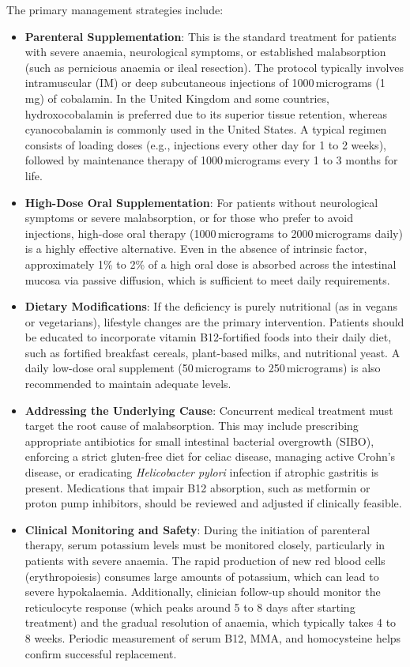 The primary management strategies include:
\begin{itemize}
    \item \textbf{Parenteral Supplementation}: This is the standard treatment for patients with severe anaemia, neurological symptoms, or established malabsorption (such as pernicious anaemia or ileal resection). The protocol typically involves intramuscular (IM) or deep subcutaneous injections of 1000\,micrograms (1\,mg) of cobalamin. In the United Kingdom and some countries, hydroxocobalamin is preferred due to its superior tissue retention, whereas cyanocobalamin is commonly used in the United States. A typical regimen consists of loading doses (e.g., injections every other day for 1 to 2 weeks), followed by maintenance therapy of 1000\,micrograms every 1 to 3 months for life.
    \item \textbf{High-Dose Oral Supplementation}: For patients without neurological symptoms or severe malabsorption, or for those who prefer to avoid injections, high-dose oral therapy (1000\,micrograms to 2000\,micrograms daily) is a highly effective alternative. Even in the absence of intrinsic factor, approximately 1\% to 2\% of a high oral dose is absorbed across the intestinal mucosa via passive diffusion, which is sufficient to meet daily requirements.
    \item \textbf{Dietary Modifications}: If the deficiency is purely nutritional (as in vegans or vegetarians), lifestyle changes are the primary intervention. Patients should be educated to incorporate vitamin B12-fortified foods into their daily diet, such as fortified breakfast cereals, plant-based milks, and nutritional yeast. A daily low-dose oral supplement (50\,micrograms to 250\,micrograms) is also recommended to maintain adequate levels.
    \item \textbf{Addressing the Underlying Cause}: Concurrent medical treatment must target the root cause of malabsorption. This may include prescribing appropriate antibiotics for small intestinal bacterial overgrowth (SIBO), enforcing a strict gluten-free diet for celiac disease, managing active Crohn's disease, or eradicating \textit{Helicobacter pylori} infection if atrophic gastritis is present. Medications that impair B12 absorption, such as metformin or proton pump inhibitors, should be reviewed and adjusted if clinically feasible.
    \item \textbf{Clinical Monitoring and Safety}: During the initiation of parenteral therapy, serum potassium levels must be monitored closely, particularly in patients with severe anaemia. The rapid production of new red blood cells (erythropoiesis) consumes large amounts of potassium, which can lead to severe hypokalaemia. Additionally, clinician follow-up should monitor the reticulocyte response (which peaks around 5 to 8 days after starting treatment) and the gradual resolution of anaemia, which typically takes 4 to 8 weeks. Periodic measurement of serum B12, MMA, and homocysteine helps confirm successful replacement.
\end{itemize}

